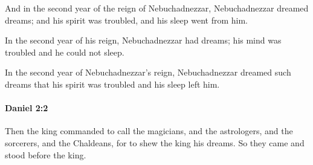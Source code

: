 			\begin{versebox}
					\item[BHS] 
					\item[LXX] 
					\item[ASV] And in the second year of the reign of Nebuchadnezzar, Nebuchadnezzar dreamed dreams; and his spirit was troubled, and his sleep went from him.
					\item[NIV] In the second year of his reign, Nebuchadnezzar had dreams; his mind was troubled and he could not sleep.
					\item[NRSV] In the second year of Nebuchadnezzar’s reign, Nebuchadnezzar dreamed such dreams that his spirit was troubled and his sleep left him.
			\end{versebox}

		\paragraph{Daniel 2:2} %
			\label{DANIEL-2-2}

			Then the king commanded to call the magicians, and the astrologers, and the sorcerers, and the Chaldeans, for to shew the king his dreams. So they came and stood before the king.

